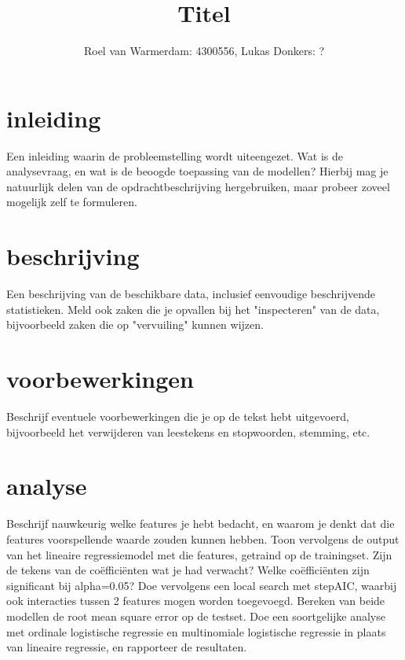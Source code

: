 \documentclass[12pt]{article}
\title{Titel}
\author{Roel van Warmerdam: 4300556, Lukas Donkers: ?}
\begin{document}
\maketitle

\begin{abstract}

\end{abstract}

\section{ inleiding}

Een inleiding waarin de probleemstelling wordt uiteengezet. Wat is de analysevraag, en wat is de beoogde toepassing van de modellen? Hierbij mag je natuurlijk delen van de opdrachtbeschrijving hergebruiken, maar probeer zoveel mogelijk zelf te formuleren.

\section{beschrijving}
Een beschrijving van de beschikbare data, inclusief eenvoudige beschrijvende statistieken. Meld ook zaken die je opvallen bij het "inspecteren" van de data, bijvoorbeeld zaken die op "vervuiling" kunnen wijzen.

\section{voorbewerkingen}
Beschrijf eventuele voorbewerkingen die je op de tekst hebt uitgevoerd, bijvoorbeeld het verwijderen van leestekens en stopwoorden, stemming, etc.

\section{analyse}
Beschrijf nauwkeurig welke features je hebt bedacht, en waarom je denkt dat die features voorspellende waarde zouden kunnen hebben. Toon vervolgens de output van het lineaire regressiemodel met die features, getraind op de trainingset. Zijn de tekens van de coëfficiënten wat je had verwacht? Welke coëfficiënten zijn significant bij alpha=0.05? Doe vervolgens een local search met stepAIC, waarbij ook interacties tussen 2 features mogen worden toegevoegd. Bereken van beide modellen de root mean square error op de testset. Doe een soortgelijke analyse met ordinale logistische regressie en multinomiale logistische regressie in plaats van lineaire regressie, en rapporteer de resultaten.
\end{document}

